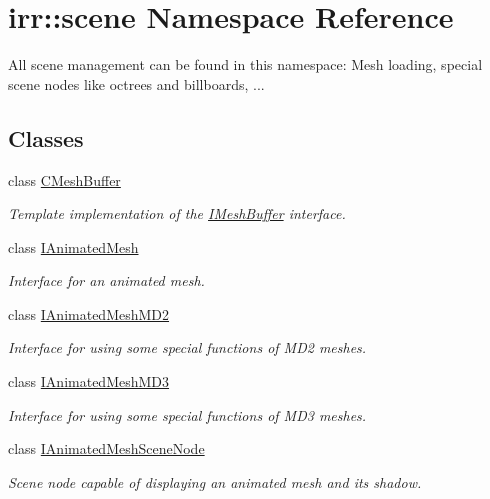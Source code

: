 \hypertarget{namespaceirr_1_1scene}{}\section{irr\+:\+:scene Namespace Reference}
\label{namespaceirr_1_1scene}


All scene management can be found in this namespace\+: Mesh loading, special scene nodes like octrees and billboards, ...  


\subsection*{Classes}
\begin{DoxyCompactItemize}
\item 
class \hyperlink{classirr_1_1scene_1_1CMeshBuffer}{C\+Mesh\+Buffer}
\begin{DoxyCompactList}\small\item\em Template implementation of the \hyperlink{classirr_1_1scene_1_1IMeshBuffer}{I\+Mesh\+Buffer} interface. \end{DoxyCompactList}\item 
class \hyperlink{classirr_1_1scene_1_1IAnimatedMesh}{I\+Animated\+Mesh}
\begin{DoxyCompactList}\small\item\em Interface for an animated mesh. \end{DoxyCompactList}\item 
class \hyperlink{classirr_1_1scene_1_1IAnimatedMeshMD2}{I\+Animated\+Mesh\+M\+D2}
\begin{DoxyCompactList}\small\item\em Interface for using some special functions of M\+D2 meshes. \end{DoxyCompactList}\item 
class \hyperlink{classirr_1_1scene_1_1IAnimatedMeshMD3}{I\+Animated\+Mesh\+M\+D3}
\begin{DoxyCompactList}\small\item\em Interface for using some special functions of M\+D3 meshes. \end{DoxyCompactList}\item 
class \hyperlink{classirr_1_1scene_1_1IAnimatedMeshSceneNode}{I\+Animated\+Mesh\+Scene\+Node}
\begin{DoxyCompactList}\small\item\em Scene node capable of displaying an animated mesh and its shadow. \end{DoxyCompactList}\item 

\end{DoxyCompactItemize}

